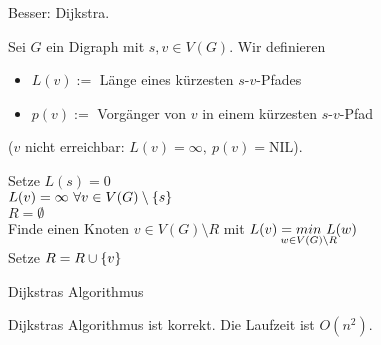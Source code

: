 Besser: Dijkstra.
\begin{definition}
	Sei $G$ ein Digraph mit $s, v \in V(G)$. Wir definieren
	\begin{itemize}
		\item $L(v) :=$ Länge eines kürzesten $s$-$v$-Pfades
		\item $p(v) :=$ Vorgänger von $v$ in einem kürzesten $s$-$v$-Pfad
	\end{itemize}
	($v$ nicht erreichbar: $L(v) = \infty,~p(v) = \text{NIL}$).
\end{definition}
\begin{algorithm}
	\vspace*{5pt}
	Setze $L(s) = 0$\\
	\hspace*{25pt}$L(v) = \infty~\forall v \in V(G)\setminus \{s\}$\\
	\hspace*{25pt}$R = \emptyset$\\
	Finde einen Knoten $v\in V(G)\setminus R$ mit $L(v) = \underset{\mathclap{w\in V(G)\setminus R}}{min}~L(w)$\\
	Setze $R = R \cup \{v\}$\\
	\caption{Dijkstras Algorithmus}
	\label{fig:Algorithmus}
\end{algorithm}
\begin{satz}
	Dijkstras Algorithmus ist korrekt. Die Laufzeit ist $O(n^2)$.
\end{satz}
